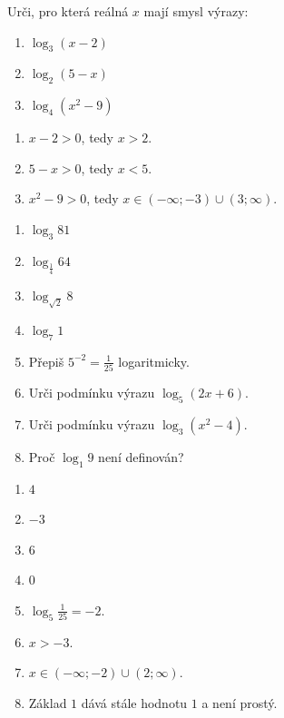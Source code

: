 \documentclass[11pt,a4paper]{article}
\begin{document}
\begin{prikladReseniBox}[title={Příklad 4}]
Urči, pro která reálná $x$ mají smysl výrazy:
\begin{enumerate}[label=\alph*)]
\item $\log_3(x-2)$
\item $\log_2(5-x)$
\item $\log_4(x^2-9)$
\end{enumerate}
\tcblower
\begin{enumerate}[label=\alph*)]
\item $x-2>0$, tedy $x>2$.
\item $5-x>0$, tedy $x<5$.
\item $x^2-9>0$, tedy $x\in(-\infty;-3)\cup(3;\infty)$.
\end{enumerate}
\end{prikladReseniBox}
\begin{zadaniReseniBox}[title={Samostatná práce 1}]
\begin{enumerate}[label=\alph*)]
\item $\log_3 81$
\item $\log_{\frac14} 64$
\item $\log_{\sqrt{2}} 8$
\item $\log_7 1$
\item Přepiš $5^{-2}=\frac1{25}$ logaritmicky.
\item Urči podmínku výrazu $\log_5(2x+6)$.
\item Urči podmínku výrazu $\log_3(x^2-4)$.
\item Proč $\log_1 9$ není definován?
\end{enumerate}
\tcblower
\begin{enumerate}[label=\alph*)]
\item $4$
\item $-3$
\item $6$
\item $0$
\item $\log_5\frac1{25}=-2$.
\item $x>-3$.
\item $x\in(-\infty;-2)\cup(2;\infty)$.
\item Základ $1$ dává stále hodnotu $1$ a není prostý.
\end{enumerate}
\end{zadaniReseniBox}
\end{document}
